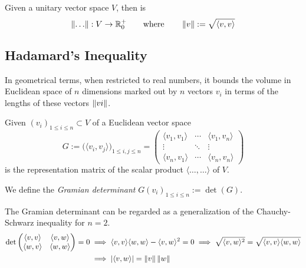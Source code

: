 \begin{corollary}
   Given a unitary vector space \(V\), then is
   \[\left\lVert\ldots\right\rVert: V \to \mathbb{R}_0^+ \qquad\text{where}\qquad \left\lVert v\right\rVert := \sqrt{\langle v, v\rangle}\]
\end{corollary}

\subsection{Hadamard's Inequality}
In geometrical terms, when restricted to real numbers, it bounds the volume in Euclidean space of \(n\) dimensions marked out by \(n\) vectors \(v_i\) in terms of the lengths of these vectors \(\left\lVert vi\right\rVert\).
\begin{definition}
   Given \((v_i)_{1 \leq i \leq n} \subset V\) of a Euclidean vector space
   \[G := \big(\langle v_i, v_j\rangle\big)_{1 \leq i,j \leq n} = \begin{pmatrix} \langle v_1, v_1 \rangle & \cdots & \langle v_1, v_n\rangle\\ \vdots & \ddots & \vdots\\\langle v_n, v_1\rangle & \cdots & \langle v_n, v_n \rangle\end{pmatrix}\]
   is the representation matrix of the scalar product \(\langle \ldots, \ldots \rangle\) of \(V\).

   We define the \emph{Gramian determinant} \(G(v_i)_{1 \leq i \leq n} := \det(G)\).
\end{definition}
\begin{remark}
   The Gramian determinant can be regarded as a generalization of the Chauchy-Schwarz inequality for \(n = 2\).
   \begin{equation*}
      \begin{split}
         \det\begin{pmatrix}\langle v, v\rangle & \langle v, w\rangle\\\langle w, v \rangle & \langle w, w\rangle\end{pmatrix} = 0 & \implies \langle v, v \rangle\langle w, w\rangle - \langle v, w\rangle^2 = 0 \implies \sqrt{\langle v, w \rangle^2} = \sqrt{\langle v, v\rangle \langle w, w\rangle}\\
         & \implies \left\lvert\langle v, w\rangle\right\rvert = \left\lVert v\right\rVert \left\lVert w\right\rVert
      \end{split}
   \end{equation*}
\end{remark}

